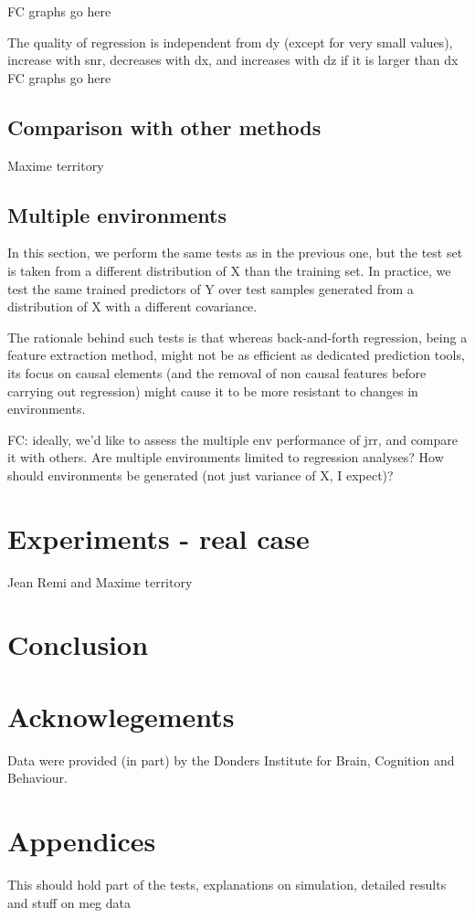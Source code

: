 \documentclass{article}
\begin{document}
FC graphs go here

The quality of regression is independent from dy (except for very small values), increase with snr, decreases with dx, and increases with dz if it is larger than dx
FC graphs go here

\subsection{Comparison with other methods}
Maxime territory

\subsection{Multiple environments}
In this section, we perform the same tests as in the previous one, but the test set is taken from a different distribution of X than the training set.
%
In practice, we test the same trained predictors of Y over test samples generated from a distribution of X with a different covariance.

The rationale behind such tests is that whereas back-and-forth regression, being a feature extraction method, might not be as efficient as dedicated prediction tools, its focus on causal elements (and the removal of non causal features before carrying out regression) might cause it to be more resistant to changes in environments.

FC: ideally, we'd like to assess the multiple env performance of jrr, and compare it with others.
%
Are multiple environments limited to regression analyses? How should environments be generated (not just variance of X, I expect)?

\section{Experiments - real case}
Jean Remi and Maxime territory



\section{Conclusion}

\section{Acknowlegements}
Data were provided (in part) by the Donders Institute for Brain, Cognition and Behaviour.

\clearpage
\newpage




\section{Appendices}

This should hold part of the tests, explanations on simulation, detailed results and stuff on meg data
\end{document}
